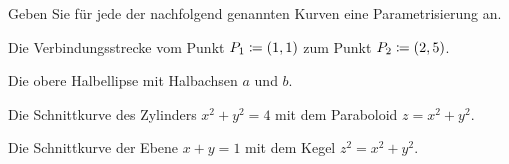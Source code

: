 \begin{atiTask}[
  title = Kurve gegeben, Parametrisierung gesucht
]
  Geben Sie für jede der nachfolgend genannten Kurven eine Parametrisierung an.
  \begin{atiSubtasks}
    \item{
      Die Verbindungsstrecke vom Punkt $P_1 \coloneqq (1,1)$ zum Punkt $P_2\coloneqq (2,5)$.
    }
    \item{
      Die obere Halbellipse mit Halbachsen $a$ und $b$.
    }
    \item{
      Die Schnittkurve des Zylinders $x^2 + y^2 = 4$ mit dem Paraboloid $z = x^2 + y^2$.
    }
    \item{
      Die Schnittkurve der Ebene $x+y=1$ mit dem Kegel $z^2 = x^2 + y^2$.
    }
  \end{atiSubtasks}
\end{atiTask}